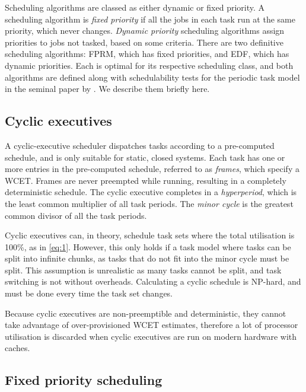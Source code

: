 Scheduling algorithms are classed as either dynamic or fixed priority. A scheduling algorithm 
is \emph{fixed priority} if all the jobs in each task run at the same priority, which never changes. 
\emph{Dynamic priority} scheduling algorithms assign priorities to jobs not tasked, based on some criteria. 
There are two definitive scheduling algorithms: \gls{FPRM}, which has fixed priorities, and
\gls{EDF}, which has dynamic priorities. Each is optimal for its respective scheduling class,  and both algorithms are defined along with
schedulability tests for the periodic task model in the seminal paper by \citet{Liu_Layland_73}. We
describe them briefly here. 

\subsection{Cyclic executives}
\label{s:cyclic-executive}

A cyclic-executive scheduler dispatches tasks according to a pre-computed schedule, and is only
suitable for static, closed systems. Each task
has one or more entries in the pre-computed schedule, referred to as \emph{frames}, which specify a
\gls{WCET}. Frames are never preempted while running, resulting in a completely deterministic
schedule. The cyclic executive completes in a
\emph{hyperperiod}, which is the least common multiplier of all task periods. The \emph{minor cycle}
is the greatest common divisor of all the task periods.

Cyclic executives can, in theory, schedule task sets where the total utilisation is 100\%, as in \cref{eq:1}.
However, this only holds
if a task model where tasks can be split into infinite chunks, as tasks that do not fit into the
minor cycle must be split. This assumption is unrealistic as many tasks
cannot be split, and task switching is not without overheads. Calculating a cyclic schedule is
NP-hard, and must be done every time the task set changes.

Because cyclic executives are non-preemptible and deterministic, they cannot take advantage of 
over-provisioned \gls{WCET} estimates, therefore a lot of processor utilisation is discarded
when cyclic executives are run on modern hardware with caches. 

\subsection{Fixed priority scheduling}
\label{s:fp}

